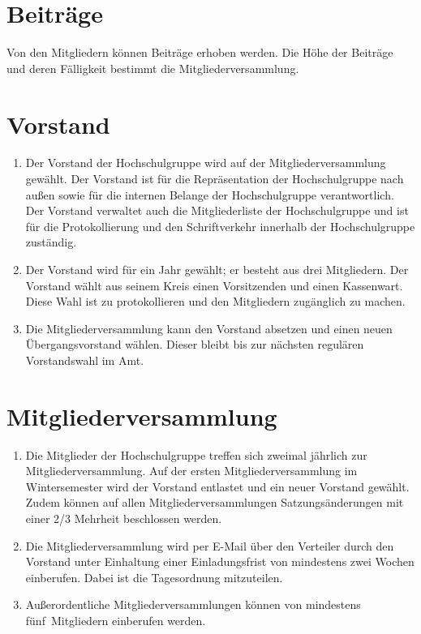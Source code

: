 \documentclass[a4paper]{scrartcl}
\begin{document}
\section{Beiträge}
Von den Mitgliedern können Beiträge erhoben werden. Die Höhe der Beiträge und
deren Fälligkeit bestimmt die Mitgliederversammlung.

\section{Vorstand}
\begin{enumerate}
    \item Der Vorstand der Hochschulgruppe wird auf der Mitgliederversammlung
          gewählt. Der Vorstand ist für die Repräsentation der Hochschulgruppe
          nach außen sowie für die internen Belange der Hochschulgruppe
          verantwortlich. Der Vorstand verwaltet auch die Mitgliederliste der
          Hochschulgruppe und ist für die Protokollierung und den
          Schriftverkehr innerhalb der Hochschulgruppe zuständig.
    \item Der Vorstand wird für ein Jahr gewählt; er besteht aus drei
          Mitgliedern. Der Vorstand wählt aus seinem Kreis einen Vorsitzenden
          und einen Kassenwart. Diese Wahl ist zu protokollieren und den
          Mitgliedern zugänglich zu machen.
    \item Die Mitgliederversammlung kann den Vorstand absetzen und einen neuen
          Übergangsvorstand wählen. Dieser bleibt bis zur nächsten regulären Vorstandswahl im Amt.
\end{enumerate}



\section{Mitgliederversammlung}
\begin{enumerate}
    \item Die Mitglieder der Hochschulgruppe treffen sich zweimal jährlich zur
          Mitgliederversammlung. Auf der ersten Mitgliederversammlung im
          Wintersemester wird der Vorstand entlastet und ein neuer Vorstand
          gewählt. Zudem können auf allen Mitgliederversammlungen
          Satzungsänderungen mit einer 2/3 Mehrheit beschlossen werden.
    \item Die Mitgliederversammlung wird per E-Mail über den Verteiler
           durch den Vorstand unter Einhaltung einer
          Einladungsfrist von mindestens zwei Wochen einberufen. Dabei ist die
          Tagesordnung mitzuteilen.
    \item Außerordentliche Mitgliederversammlungen können von mindestens
          fünf~Mitgliedern einberufen werden.
\end{enumerate}
\end{document}
